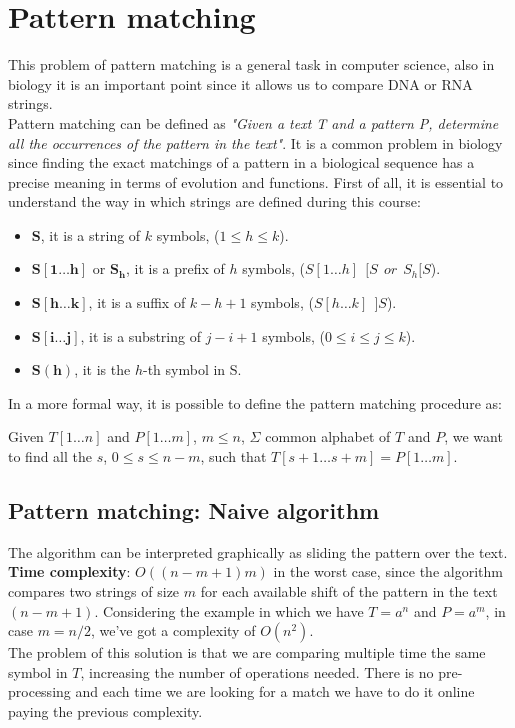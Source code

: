 \section{Pattern matching}
This problem of pattern matching is a general task in computer science, also in biology it is an important point since it allows us to compare DNA or RNA strings.\\
Pattern matching can be defined as \textit{"Given a text T and a pattern P, determine all the occurrences of the pattern in the text"}. It is a common problem in biology since finding the exact matchings of a pattern in a biological sequence has a precise meaning in terms of evolution and functions.
First of all, it is essential to understand the way in which strings are defined during this course:
\begin{itemize}
	\item $\mathbf{S}$, it is a string of $k$ symbols, ($ 1 \leq h \leq k $).
	\item $\mathbf{S[1\dots h]}$ or $\mathbf{S_h}$, it is a prefix of $h$ symbols, ($S[1 \dots h] ~~ [ S ~~ or ~~ S_h[ S $).
	\item $\mathbf{S[h \dots k]}$, it is a suffix of $k-h+1$ symbols, ($S[h \dots k] ~~ ]S$).
	\item $\mathbf{S[i \dots j]}$, it is a substring of $j-i+1$ symbols, ($0 \leq i \leq j \leq k$).
	\item $\mathbf{S(h)}$, it is the $h$-th symbol in S.
\end{itemize}
In a more formal way, it is possible to define the pattern matching procedure as:
\par \medskip \noindent
Given $T[1 \dots n]$ and $P[1 \dots m]$, $m \leq n$, $\Sigma$ common alphabet of $T$ and $P$, we want to find all the $s$, $0 \leq s \leq n-m$, such that $T[s+1 \dots s+m] = P[1 \dots m]$.

\subsection{Pattern matching: Naive algorithm}
The algorithm can be interpreted graphically as sliding the pattern over the 
text.
\textbf{Time complexity}: $O((n-m+1)m)$ in the worst case, since the algorithm compares two strings of size $m$ for each available shift of the pattern in the text $(n-m+1)$. Considering the example in which we have $T = a^n$ and $P = a^m$, in case $m=n/2$, we've got a complexity of $O(n^2)$.\\
The problem of this solution is that we are comparing multiple time the same symbol in $T$, increasing the number of operations needed. There is no pre-processing and each time we are looking for a match we have to do it online paying the previous complexity.

